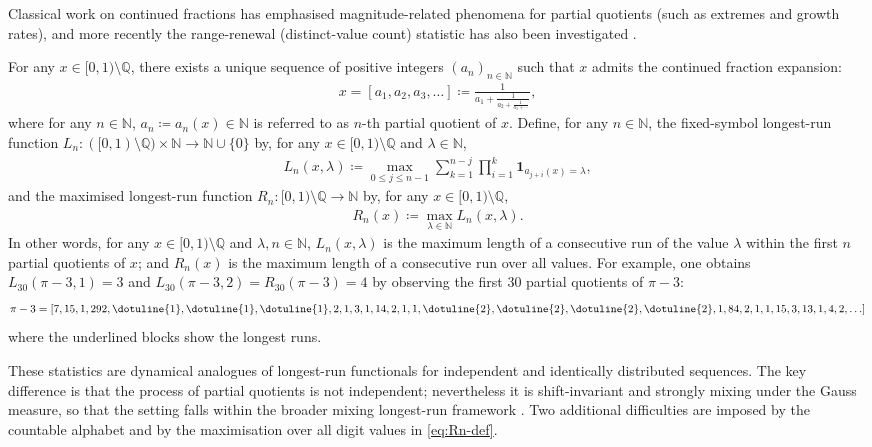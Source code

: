 \documentclass[12pt,reqno]{amsart}
\theoremstyle{definition}
\theoremstyle{plain}
\begin{document}
Classical work on continued fractions has emphasised magnitude-related phenomena for partial quotients (such as extremes and growth rates), and more recently the range-renewal (distinct-value count) statistic has also been investigated \cite{WuXie2017RangeRenewalCF}. 

For any $x\in[0,1)\setminus\mathbb{Q}$, there exists a unique sequence of positive integers $(a_n)_{n\in\mathbb{N}}$ such that $x$ admits the continued fraction expansion:
\begin{align*}
    x=[a_1,a_2,a_3,\dots]\coloneqq\frac{1}{\displaystyle a_1+\frac{1}{\displaystyle a_2+\frac{1}{a_3+\cdots}}},
\end{align*}
where for any $n\in\mathbb{N}$, $a_n\coloneqq a_n(x)\in\mathbb{N}$ is referred to as $n$-th partial quotient of $x$. 
Define, for any $n\in\mathbb{N}$, the fixed-symbol longest-run function $L_n:([0,1)\setminus\mathbb{Q})\times\mathbb{N}\to\mathbb{N}\cup\{0\}$ by, for any $x\in [0,1)\setminus\mathbb{Q}$ and $\lambda\in\mathbb{N}$,
\begin{align}\label{eq:Ln-def}
    L_n(x,\lambda)
    \coloneqq\max_{0\leq j\leq n-1}\sum_{k=1}^{n-j}\prod_{i=1}^k\mathbf{1}_{a_{j+i}(x)=\lambda},
\end{align}
and the maximised longest-run function $R_n:[0,1)\setminus\mathbb{Q}\to\mathbb{N}$ by, for any $x\in[0,1)\setminus\mathbb{Q}$,
\begin{align}\label{eq:Rn-def}
    R_n(x)\coloneqq \max_{\lambda\in\mathbb N} L_n(x,\lambda).
\end{align}
In other words, for any $x\in[0,1)\setminus\mathbb{Q}$ and $\lambda,n\in\mathbb{N}$, $L_n(x,\lambda)$ is the maximum length of a consecutive run of the value $\lambda$ within the first $n$ partial quotients of $x$; and $R_n(x)$ is the maximum length of a consecutive run over all values. For example, one obtains $L_{30}(\pi-3,1)=3$ and $L_{30}(\pi-3,2)=R_{30}(\pi-3)=4$ by observing the first 30 partial quotients of $\pi-3$:
\begin{align*}
    \pi-3=[7,15,1,292,
    \dotuline{1},\dotuline{1},\dotuline{1},
    2,1,3,1,14,2,1,1,
    \dotuline{2},\dotuline{2},\dotuline{2},\dotuline{2},
    1,84,2,1,1,15,3,13,1,4,2,\ldots]
\end{align*}
where the underlined blocks show the longest runs.

These statistics are dynamical analogues of longest-run functionals for independent and identically distributed sequences. The key difference is that the process of partial quotients is not independent; nevertheless it is shift-invariant and strongly mixing under the Gauss measure, so that the setting falls within the broader mixing longest-run framework \cite{grill1987erdHos}. Two additional difficulties are imposed by the countable alphabet and by the maximisation over all digit values in \eqref{eq:Rn-def}.
\end{document}
